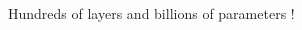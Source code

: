 \documentclass[usenames,dvipsnames]{beamer}
\begin{document}
\begin{frame}{\secname}{\subsecname}
\begin{columns}
\begin{column}{0.3\textwidth}
\begin{center}
                \end{center}
            \end{column}
        \end{columns}
        \vspace{-2em}
        Hundreds of layers and billions of parameters !
    \end{frame}
    
\end{document}
